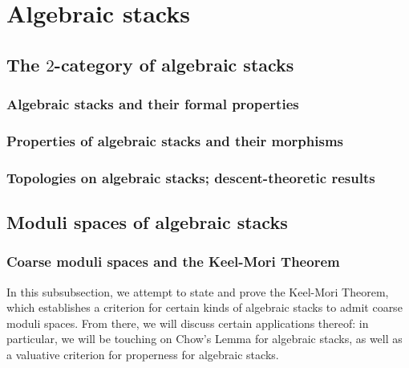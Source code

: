 \section{Algebraic stacks}
    \subsection{The \texorpdfstring{$2$}{}-category of algebraic stacks}
        \subsubsection{Algebraic stacks and their formal properties}
    
        \subsubsection{Properties of algebraic stacks and their morphisms}
        
        \subsubsection{Topologies on algebraic stacks; descent-theoretic results}
    
    \subsection{Moduli spaces of algebraic stacks}
        \subsubsection{Coarse moduli spaces and the Keel-Mori Theorem}
            In this subsubsection, we attempt to state and prove the Keel-Mori Theorem, which establishes a criterion for certain kinds of algebraic stacks to admit coarse moduli spaces. From there, we will discuss certain applications thereof: in particular, we will be touching on Chow's Lemma for algebraic stacks, as well as a valuative criterion for properness for algebraic stacks.
            
